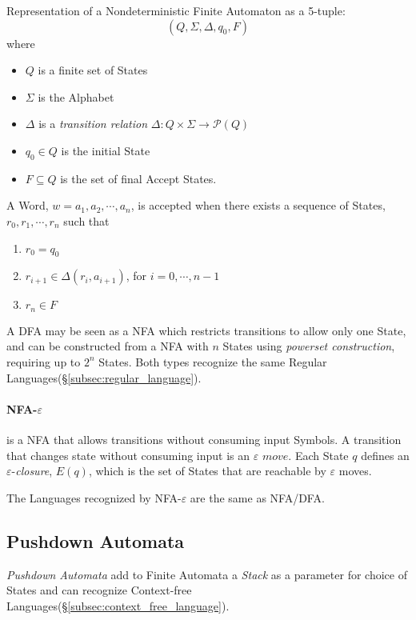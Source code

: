 \documentclass{article}
\begin{document}
Representation of a Nondeterministic Finite Automaton as a
5-tuple:
\[
    (Q,\Sigma,\Delta,q_0,F)
\]
where
\begin{itemize}
\item $Q$ is a finite set of States
\item $\Sigma$ is the Alphabet
\item $\Delta$ is a \emph{transition relation} $\Delta: Q \times
  \Sigma \rightarrow \mathcal{P}(Q)$
\item $q_0 \in Q$ is the initial State
\item $F \subseteq Q$ is the set of final Accept States.
\end{itemize}

A Word, $w=a_1,a_2,\cdots,a_n$, is accepted when there exists a
sequence of States, $r_0,r_1,\cdots,r_n$ such that
\begin{enumerate}
\item $r_0 = q_0$
\item $r_{i+1} \in \Delta(r_i, a_{i+1})$, for $i = 0, \cdots, n-1$
\item $r_n \in F$
\end{enumerate}

A DFA may be seen as a NFA which restricts transitions to allow only
one State, and can be constructed from a NFA with $n$ States using
\emph{powerset construction}, requiring up to $2^n$ States. Both types
recognize the same Regular Languages(\S\ref{subsec:regular_language}).

\paragraph{NFA-$\varepsilon$} is a NFA that allows transitions
without consuming input Symbols. A transition that changes state
without consuming input is an $\varepsilon$ $move$. Each State $q$
defines an $\varepsilon$-\emph{closure}, $E(q)$, which is the set of
States that are reachable by $\varepsilon$ moves.

The Languages recognized by NFA-$\varepsilon$ are the same as NFA/DFA.

\subsection{Pushdown Automata}\label{subsec:pushdown_automata}
\emph{Pushdown Automata} add to Finite Automata a \emph{Stack} as a
parameter for choice of States and can recognize Context-free
Languages(\S\ref{subsec:context_free_language}).
\end{document}
